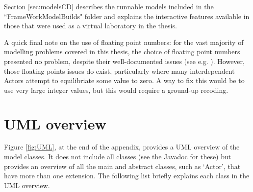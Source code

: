 Section \ref{sec:modelsCD} describes the runnable models included in the ``FrameWorkModelBuilds" folder and explains the interactive features available in those that were used as a virtual laboratory in the thesis. 

A quick final note on the use of floating point numbers: for the vast majority of modelling problems covered in this thesis, the choice of floating point numbers presented no problem, despite their well-documented issues (see e.g. \citealt{polhill_what_2006}). However, those floating points issues do exist, particularly where many interdependent Actors attempt to equilibriate some value to zero. A way to fix this would be to use very large integer values, but this would require a ground-up recoding. 

\section{UML overview \label{sec:uml}}

Figure \ref{fig:UML}, at the end of the appendix, provides a UML overview of the model classes. It does not include all classes (see the Javadoc for these) but provides an overview of all the main and abstract classes, such as `Actor', that have more than one extension. The following list briefly explains each class in the UML overview. 

